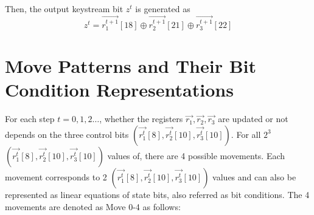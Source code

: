 Then, the output keystream bit $z^t$ is generated as
\begin{equation}\label{eq:OutputZ}
  z^t=\vec{r_1^{t+1}}   [18]\oplus \vec{r_2^{t+1}}[21]\oplus \vec{r_3^{t+1}}[22]
\end{equation}
\section{Move Patterns and Their Bit Condition Representations}\label{sec:MovePatternAndBC}
For each step $t=0,1,2\ldots$, whether the registers $\vec{r_1},\vec{r_2},\vec{r_3}$ are updated or not depends on the three control bits $(\vec{r_1^t}[8],\vec{r_2^t}[10],\vec{r_3^t}[10])$.
For all $2^3$ $(\vec{r_1^t}[8],\vec{r_2^t}[10],\vec{r_3^t}[10])$ values of, there are 4 possible movements.
Each movement corresponds to 2 $(\vec{r_1^t}[8],\vec{r_2^t}[10],\vec{r_3^t}[10])$ values and can also be represented as linear equations of state bits, also referred as bit conditions.
The 4 movements are denoted as Move 0-4 as follows:
